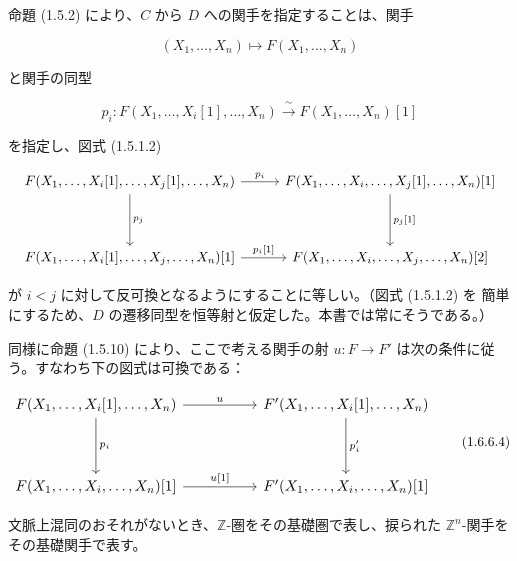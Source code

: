 \clearpage
{}%
命題 (1.5.2) により、$C$ から $D$ への関手を指定することは、関手

\begin{equation}
  (X_1,\ldots,X_n)\longmapsto F(X_1,\ldots,X_n)
  \tag{1.6.6.2}
\end{equation}

と関手の同型

\begin{equation}
  p_i\colon
  F(X_1,\ldots,X_i[1],\ldots,X_n)
  \xrightarrow{\ \sim\ }
  F(X_1,\ldots,X_n)[1]
  \tag{1.6.6.3}
\end{equation}

を指定し、図式 (1.5.1.2)

\begin{equation*}
  \resizebox{\textwidth}{!}{%
    $\begin{tikzcd}[ampersand replacement=\&,column sep=2.8em,row sep=3.8em]
      F(X_1,\ldots,X_i[1],\ldots,X_j[1],\ldots,X_n)
        \arrow[r,"{p_i}"]
        \arrow[d,"{p_j}"]
        \& F(X_1,\ldots,X_i,\ldots,X_j[1],\ldots,X_n)[1]
          \arrow[d,"{p_j[1]}"] \\
      F(X_1,\ldots,X_i[1],\ldots,X_j,\ldots,X_n)[1]
        \arrow[r,"{p_i[1]}"]
        \& F(X_1,\ldots,X_i,\ldots,X_j,\ldots,X_n)[2]
    \end{tikzcd}$%
  }
\end{equation*}

が $i<j$ に対して反可換となるようにすることに等しい。（図式 (1.5.1.2) を
簡単にするため、$D$ の遷移同型を恒等射と仮定した。本書では常にそうである。）

同様に命題 (1.5.10) により、ここで考える関手の射
$u\colon F\to F'$ は次の条件に従う。すなわち下の図式は可換である：

\begin{equation}
  \resizebox{0.92\textwidth}{!}{%
    $\begin{tikzcd}[ampersand replacement=\&,column sep=5.0em,row sep=3.8em]
      F(X_1,\ldots,X_i[1],\ldots,X_n)
        \arrow[r,"u"]
        \arrow[d,"{p_i}"]
        \& F'(X_1,\ldots,X_i[1],\ldots,X_n)
          \arrow[d,"{p'_i}"] \\
      F(X_1,\ldots,X_i,\ldots,X_n)[1]
        \arrow[r,"{u[1]}"]
        \& F'(X_1,\ldots,X_i,\ldots,X_n)[1]
    \end{tikzcd}$%
  }
  \tag{1.6.6.4}
\end{equation}

文脈上混同のおそれがないとき、$\mathbb Z$-圏をその基礎圏で表し、捩られた
$\mathbb Z^n$-関手をその基礎関手で表す。

